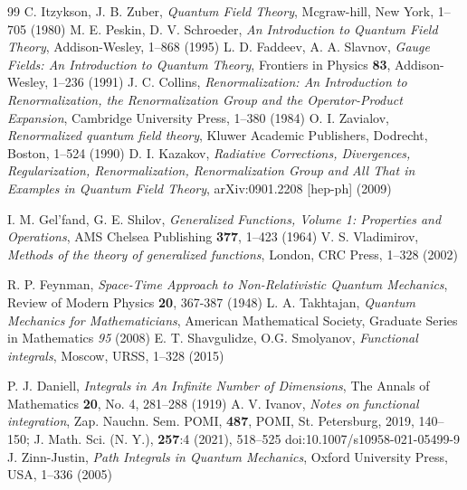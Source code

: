 \documentclass[a4paper]{article}
\begin{document}
\begin{thebibliography}{99}
C. Itzykson, J. B. Zuber, \textit{Quantum Field Theory}, Mcgraw-hill, New York, 1--705 (1980)
M. E. Peskin, D. V. Schroeder, \textit{An Introduction to Quantum Field Theory}, Addison-Wesley, 1--868 (1995)
L. D. Faddeev, A. A. Slavnov, \textit{Gauge Fields: An Introduction to Quantum Theory}, Frontiers in Physics \textbf{83}, Addison-Wesley, 1--236 (1991)
J. C. Collins, \textit{Renormalization: An Introduction to Renormalization, the Renormalization Group and the Operator-Product Expansion}, Cambridge University Press, 1--380 (1984)
O. I. Zavialov, \textit{Renormalized quantum field theory}, Kluwer Academic Publishers, Dodrecht, Boston, 1--524 (1990)
D. I. Kazakov, \textit{Radiative Corrections, Divergences, Regularization, Renormalization, Renormalization Group and All That in Examples in Quantum Field Theory}, arXiv:0901.2208 [hep-ph] (2009)

I. M. Gel'fand, G. E. Shilov, 
\textit{Generalized Functions, Volume 1: Properties and Operations},
AMS Chelsea Publishing \textbf{377}, 1--423 (1964)
V. S. Vladimirov, \textit{Methods of the theory of generalized functions}, London,
CRC Press, 1--328 (2002)

R. P. Feynman, \textit{Space-Time Approach to Non-Relativistic Quantum Mechanics}, Review of Modern Physics \textbf{20}, 367-387 (1948)
L. A. Takhtajan, \textit{Quantum Mechanics for Mathematicians}, American Mathematical Society, Graduate Series in Mathematics \textit{95} (2008)
E. T. Shavgulidze, O.G. Smolyanov, \textit{Functional integrals}, Moscow, URSS, 1--328 (2015)


P. J. Daniell, \textit{Integrals in An Infinite Number of Dimensions}, The Annals of
Mathematics \textbf{20}, No. 4, 281--288 (1919)
A. V. Ivanov, \textit{Notes on functional integration}, Zap. Nauchn. Sem. POMI, \textbf{487}, POMI, St. Petersburg, 2019, 140--150; J. Math. Sci. (N. Y.), \textbf{257}:4 (2021), 518--525 doi:10.1007/s10958-021-05499-9
J. Zinn-Justin, \textit{Path Integrals in Quantum Mechanics}, Oxford University Press, USA, 1--336 (2005)


\end{thebibliography}
\end{document}
